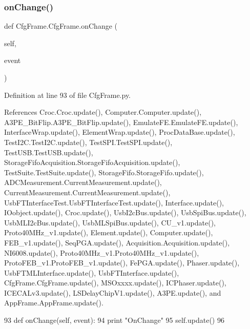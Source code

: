 \subsubsection{\texorpdfstring{on\+Change()}{onChange()}}
{\footnotesize\ttfamily def Cfg\+Frame.\+Cfg\+Frame.\+on\+Change (\begin{DoxyParamCaption}\item[{}]{self,  }\item[{}]{event }\end{DoxyParamCaption})}



Definition at line 93 of file Cfg\+Frame.\+py.



References Croc.\+Croc.\+update(), Computer.\+Computer.\+update(), A3\+P\+E\+\_\+\+Bit\+Flip.\+A3\+P\+E\+\_\+\+Bit\+Flip.\+update(), Emulate\+F\+E.\+Emulate\+F\+E.\+update(), Interface\+Wrap.\+update(), Element\+Wrap.\+update(), Proc\+Data\+Base.\+update(), Test\+I2\+C.\+Test\+I2\+C.\+update(), Test\+S\+P\+I.\+Test\+S\+P\+I.\+update(), Test\+U\+S\+B.\+Test\+U\+S\+B.\+update(), Storage\+Fifo\+Acquisition.\+Storage\+Fifo\+Acquisition.\+update(), Test\+Suite.\+Test\+Suite.\+update(), Storage\+Fifo.\+Storage\+Fifo.\+update(), A\+D\+C\+Measurement.\+Current\+Measurement.\+update(), Current\+Measurement.\+Current\+Measurement.\+update(), Usb\+F\+T\+Interface\+Test.\+Usb\+F\+T\+Interface\+Test.\+update(), Interface.\+update(), I\+Oobject.\+update(), Croc.\+update(), Usb\+I2c\+Bus.\+update(), Usb\+Spi\+Bus.\+update(), Usb\+M\+L\+I2c\+Bus.\+update(), Usb\+M\+L\+Spi\+Bus.\+update(), C\+U\+\_\+v1.\+update(), Proto40\+M\+Hz\+\_\+v1.\+update(), Element.\+update(), Computer.\+update(), F\+E\+B\+\_\+v1.\+update(), Seq\+P\+G\+A.\+update(), Acquisition.\+Acquisition.\+update(), N\+I6008.\+update(), Proto40\+M\+Hz\+\_\+v1.\+Proto40\+M\+Hz\+\_\+v1.\+update(), Proto\+F\+E\+B\+\_\+v1.\+Proto\+F\+E\+B\+\_\+v1.\+update(), Fe\+P\+G\+A.\+update(), Phaser.\+update(), Usb\+F\+T\+M\+L\+Interface.\+update(), Usb\+F\+T\+Interface.\+update(), Cfg\+Frame.\+Cfg\+Frame.\+update(), M\+S\+Oxxxx.\+update(), I\+C\+Phaser.\+update(), I\+C\+E\+C\+A\+Lv3.\+update(), L\+S\+Delay\+Chip\+V1.\+update(), A3\+P\+E.\+update(), and App\+Frame.\+App\+Frame.\+update().


\begin{DoxyCode}
93     \textcolor{keyword}{def }onChange(self, event):
94         \textcolor{keywordflow}{print} \textcolor{stringliteral}{"OnChange"}
95         self.update()
96         
\end{DoxyCode}
\mbox{\label{classCfgFrame_1_1CfgFrame_aab5f2e7597bccc345b1c953cac83275d}} 
